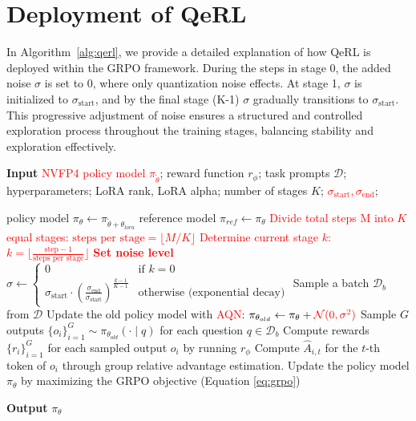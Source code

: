 \section{Deployment of QeRL}\label{ap:pseudocode}
In Algorithm~\ref{alg:qerl}, we provide a detailed explanation of how QeRL is deployed within the GRPO framework. During the steps in stage 0, the added noise 
$\sigma$ is set to 0, where only quantization noise effects. At stage 1, $\sigma$ is initialized to $\sigma_{\text{start}}$, and by the final stage (K-1) $\sigma$ gradually transitions to $\sigma_{\text{start}}$. This progressive adjustment of noise ensures a structured and controlled exploration process throughout the training stages, balancing stability and exploration effectively.
\begin{algorithm}[t]
  \small
  \caption{Deploy GRPO with QeRL and Adaptive Quantization Noise}
\textbf{Input} \textcolor{red}{NVFP4 policy model $\pi_{\tilde{\theta}}$}; reward function $r_{\phi}$; task prompts $\mathcal{D}$; 
  hyperparameters; LoRA rank, LoRA alpha;  number of stages $K$; \textcolor{red}{$\sigma_{\text{start}}, \sigma_\text{end}$};
  \begin{algorithmic}[1]
    \State policy model $\pi_\theta \leftarrow \pi_{\tilde{\theta} + \theta_{lora}}$
       \State reference model $\pi_{ref} \leftarrow \pi_{\theta}$
      \State \textcolor{red}{Divide total steps M into $K$ equal stages: $\text{steps per stage} = \lfloor M / K \rfloor$}
       \State \textcolor{red}{Determine current stage $k$: $k = \lfloor \frac{\text{step} - 1}{\text{steps per stage}} \rfloor $}
       \State \textcolor{red}{\textbf{Set noise level}} $\sigma \leftarrow \begin{cases}
          0 & \text{if } k=0 \\
           \sigma_{\text{start}} \cdot \left( \frac{\sigma_{\text{end}}}{\sigma_{\text{start}}} \right)^{\frac{k - 1}{K - 1}} & \text{otherwise (exponential decay)}
      \end{cases}$ 
      \State Sample a batch $\mathcal{D}_b$ from $\mathcal{D}$
      \State Update the old policy model with \textcolor{red}{AQN}: $\pi_{\theta_{old}} \leftarrow \pi_{\theta} + \textcolor{red}{\mathcal{N}(0, \sigma^2)}$ 
      \State Sample $G$ outputs $\{o_i\}_{i=1}^G \sim \pi_{\theta_{old}} (\cdot \mid q) $ for each question $q \in \mathcal{D}_b$
      \State Compute rewards $\{r_i\}_{i=1}^{G}$ for each sampled output $o_i$ by running $r_{\phi}$ 
      \State Compute $\hat{A}_{i,t}$ for the $t$-th token of $o_i$ through group relative advantage estimation.
        \State Update the policy model $\pi_{\theta}$ by maximizing the GRPO objective (Equation \ref{eq:grpo})
      \EndFor
    \EndFor 
    \EndFor 
  \end{algorithmic}
  \textbf{Output} $\pi_\theta$
  \label{alg:qerl}
\end{algorithm}


